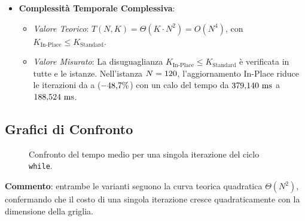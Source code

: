 \begin{itemize}
    \item \textbf{Complessità Temporale Complessiva}:
    \begin{itemize}
        \item \textit{Valore Teorico}: $T(N, K) = \Theta(K \cdot N^2) = O(N^4)$, con $K_{\text{In-Place}} \le K_{\text{Standard}}$.
        \item \textit{Valore Misurato}: La disuguaglianza $K_{\text{In-Place}} \le K_{\text{Standard}}$ è verificata in tutte e \benchNistanze{} le istanze. Nell'istanza $N=120{}$, l'aggiornamento In-Place riduce le iterazioni da \benchKstdGrande{} a \benchKipGrande{} ($-48{,}7{}\%$) con un calo del tempo da $379{,}140{}\text{ ms}$ a $188{,}524{}\text{ ms}$.
    \end{itemize}
\end{itemize}

\clearpage
\subsection{Grafici di Confronto}

\begin{figure}[htbp]
\centering
{}
\caption{Confronto del tempo medio per una singola iterazione del ciclo \texttt{while}.}
\label{fig:tempo_iterazione}
\end{figure}

\noindent
\textbf{Commento}: entrambe le varianti seguono la curva teorica quadratica $\Theta(N^2)$, confermando che il costo di una singola iterazione cresce quadraticamente con la dimensione della griglia. 

